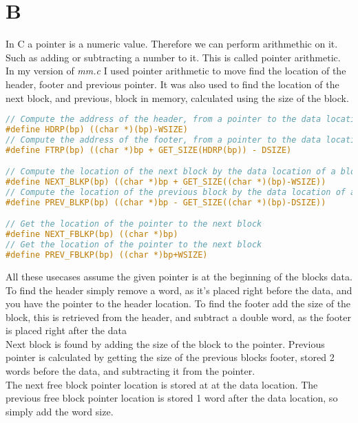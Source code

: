 \documentclass[11pt]{report}
\begin{document}
\section{B}
In C a pointer is a numeric value. Therefore we can perform arithmethic on it. Such as adding or subtracting a number to it. This is called pointer arithmetic.\\[1ex]

In my version of \textit{mm.c} I used pointer arithmetic to move find the location of the header, footer and previous pointer. It was also used to find the location of the next block, and previous, block in memory, calculated using the size of the block. 
\begin{lstlisting}[language=C]
// Compute the address of the header, from a pointer to the data location
#define HDRP(bp) ((char *)(bp)-WSIZE)
// Compute the address of the footer, from a pointer to the data location
#define FTRP(bp) ((char *)bp + GET_SIZE(HDRP(bp)) - DSIZE)

// Compute the location of the next block by the data location of a block
#define NEXT_BLKP(bp) ((char *)bp + GET_SIZE((char *)(bp)-WSIZE))
// Compute the location of the previous block by the data location of a block
#define PREV_BLKP(bp) ((char *)bp - GET_SIZE((char *)(bp)-DSIZE))

// Get the location of the pointer to the next block
#define NEXT_FBLKP(bp) ((char *)bp)
// Get the location of the pointer to the next block
#define PREV_FBLKP(bp) ((char *)bp+WSIZE)
\end{lstlisting}
All these usecases assume the given pointer is at the beginning of the blocks data. To find the header simply remove a word, as it's placed right before the data, and you have the pointer to the header location. To find the footer add the size of the block, this is retrieved from the header, and subtract a double word, as the footer is placed right after the data\\[1ex]

Next block is found by adding the size of the block to the pointer. Previous pointer is calculated by getting the size of the previous blocks footer, stored 2 words before the data, and subtracting it from the pointer.\\[1ex]

The next free block pointer location is stored at at the data location. The previous free block pointer location is stored 1 word after the data location, so simply add the word size.
\end{document}
